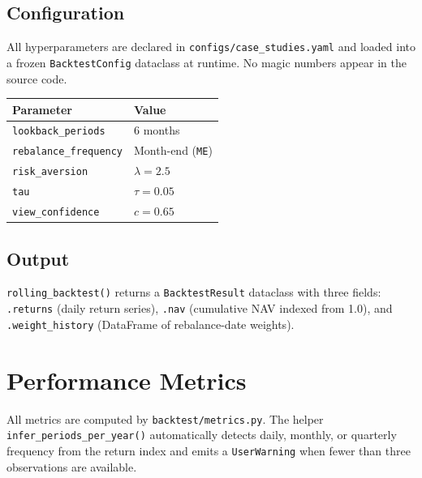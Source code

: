 \documentclass[11pt, a4paper]{article}
\newcommand{\code}[1]{\texttt{#1}}
\begin{document}
\subsection{Configuration}

All hyperparameters are declared in \code{configs/case\_studies.yaml} and
loaded into a frozen \code{BacktestConfig} dataclass at runtime. No magic
numbers appear in the source code.

\medskip
\begin{center}
\begin{tabular}{@{}ll@{}}
  \toprule
  \textbf{Parameter} & \textbf{Value} \\
  \midrule
  \code{lookback\_periods}    & 6 months \\
  \code{rebalance\_frequency} & Month-end (\code{ME}) \\
  \code{risk\_aversion}       & $\lambda = 2.5$ \\
  \code{tau}                  & $\tau = 0.05$ \\
  \code{view\_confidence}     & $c = 0.65$ \\
  \bottomrule
\end{tabular}
\end{center}

\subsection{Output}

\code{rolling\_backtest()} returns a \code{BacktestResult} dataclass with
three fields: \code{.returns} (daily return series), \code{.nav}
(cumulative NAV indexed from 1.0), and \code{.weight\_history}
(DataFrame of rebalance-date weights).

\section{Performance Metrics}

All metrics are computed by \code{backtest/metrics.py}. The helper
\code{infer\_periods\_per\_year()} automatically detects daily, monthly,
or quarterly frequency from the return index and emits a \code{UserWarning}
when fewer than three observations are available.
\end{document}
